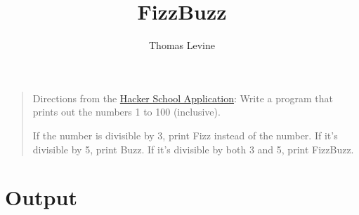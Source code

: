 \documentclass{article}
\title{FizzBuzz}
\author{Thomas Levine}
\begin{document}
\maketitle
\begin{quote}
Directions from the \href{https://www.hackerschool.com/apply}{Hacker School Application}:
Write a program that prints out the numbers 1 to 100 (inclusive).

If the number is divisible by 3, print Fizz instead of the number. If it's divisible by 5, print Buzz. If it's divisible by both 3 and 5, print FizzBuzz.
\end{quote}

\section{Output}
\end{document}
